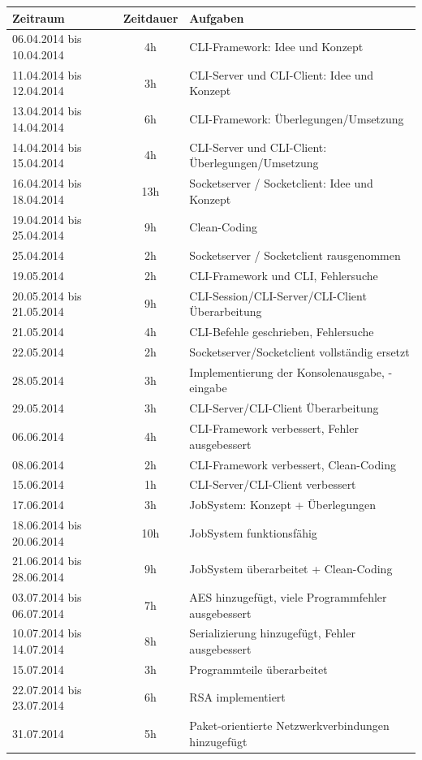 \documentclass[12pt,a4paper]{report}
\begin{document}
\begin{onehalfspace}
\begin{center}
\begin{tabular}{|l|c|l|}
\hline
\textbf{Zeitraum} & \textbf{Zeitdauer} & \textbf{Aufgaben} \\ \hline
06.04.2014 bis 10.04.2014 & 4h & CLI-Framework: Idee und Konzept\\
11.04.2014 bis 12.04.2014 & 3h & CLI-Server und CLI-Client: Idee und Konzept\\
13.04.2014 bis 14.04.2014 & 6h & CLI-Framework: Überlegungen/Umsetzung\\
14.04.2014 bis 15.04.2014 & 4h & CLI-Server und CLI-Client: Überlegungen/Umsetzung\\
16.04.2014 bis 18.04.2014 & 13h & Socketserver / Socketclient: Idee und Konzept\\
19.04.2014 bis 25.04.2014 & 9h & Clean-Coding\\
25.04.2014 & 2h & Socketserver / Socketclient rausgenommen\\
19.05.2014 & 2h & CLI-Framework und CLI, Fehlersuche\\
20.05.2014 bis 21.05.2014 & 9h & CLI-Session/CLI-Server/CLI-Client Überarbeitung\\
21.05.2014 & 4h & CLI-Befehle geschrieben, Fehlersuche\\
22.05.2014 & 2h & Socketserver/Socketclient vollständig ersetzt\\
28.05.2014 & 3h & Implementierung der Konsolenausgabe, -eingabe\\
29.05.2014 & 3h & CLI-Server/CLI-Client Überarbeitung\\
06.06.2014 & 4h & CLI-Framework verbessert, Fehler ausgebessert\\
08.06.2014 & 2h & CLI-Framework verbessert, Clean-Coding\\
15.06.2014 & 1h & CLI-Server/CLI-Client verbessert\\
17.06.2014 & 3h & JobSystem: Konzept + Überlegungen\\
18.06.2014 bis 20.06.2014 & 10h & JobSystem funktionsfähig\\
21.06.2014 bis 28.06.2014 & 9h & JobSystem überarbeitet + Clean-Coding\\
03.07.2014 bis 06.07.2014 & 7h & AES hinzugefügt, viele Programmfehler ausgebessert\\
10.07.2014 bis 14.07.2014 & 8h & Serializierung hinzugefügt, Fehler ausgebessert\\
15.07.2014 & 3h & Programmteile überarbeitet\\
22.07.2014 bis 23.07.2014 & 6h & RSA implementiert\\
31.07.2014 & 5h & Paket-orientierte Netzwerkverbindungen hinzugefügt\\ \hline
  

\end{tabular}
\end{center}
\end{onehalfspace}
\end{document}
